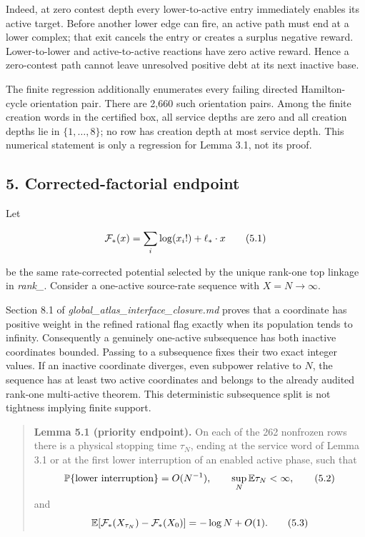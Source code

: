 Indeed, at zero contest depth every lower-to-active entry immediately
enables its active target. Before another lower edge can fire, an active
path must end at a lower complex; that exit cancels the entry or creates
a surplus negative reward. Lower-to-lower and active-to-active reactions
have zero active reward. Hence a zero-contest path cannot leave
unresolved positive debt at its next inactive base.

The finite regression additionally enumerates every failing directed
Hamilton-cycle orientation pair. There are 2,660 such orientation pairs.
Among the finite creation words in the certified box, all service depths
are zero and all creation depths lie in \(\{1,\ldots,8\}\); no row has
creation depth at most service depth. This numerical statement is only a
regression for Lemma 3.1, not its proof.

\subsection{5. Corrected-factorial
endpoint}

Let

\[
 {\cal F}_*(x)=\sum_i\log(x_i!)+\ell_*\mathbin{\cdot}x       \tag{5.1}
\]

be the same rate-corrected potential selected by the unique rank-one top
linkage in \emph{rank\_\texttt{}}. Consider
a one-active source-rate sequence with \(X=N\to\infty\).

Section 8.1 of \emph{global\_atlas\_interface\_closure.md} proves that a
coordinate has positive weight in the refined rational flag exactly when
its population tends to infinity. Consequently a genuinely one-active
subsequence has both inactive coordinates bounded. Passing to a
subsequence fixes their two exact integer values. If an inactive
coordinate diverges, even subpower relative to \(N\), the sequence has
at least two active coordinates and belongs to the already audited
rank-one multi-active theorem. This deterministic subsequence split is
not tightness implying finite support.

\begin{quote}
\textbf{Lemma 5.1 (priority endpoint).} On each of the 262 nonfrozen
rows there is a physical stopping time \(\tau_N\), ending at the service
word of Lemma 3.1 or at the first lower interruption of an enabled
active phase, such that \[
 {\mathbb P}\{\hbox{lower interruption}\}=O(N^{-1}),
 \qquad \sup_N{\mathbb E}\tau_N<\infty,                \tag{5.2}
\] and \[
 {\mathbb E}\!\left[{\cal F}_*(X_{\tau_N})
                   -{\cal F}_*(X_0)\right]
      =-\log N+O(1).                                  \tag{5.3}
\]
\end{quote}

